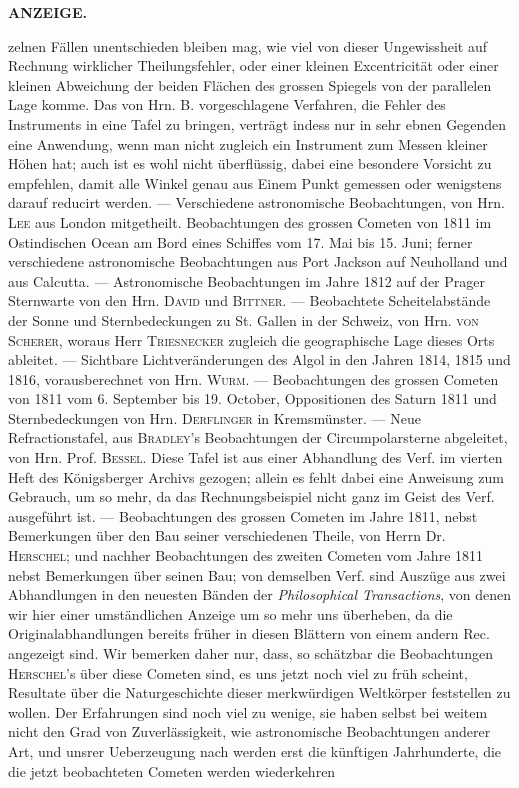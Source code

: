 \clearpage
\thispagestyle{empty}
\noindent{}%
%
\parbox[t]{\dimexpr\linewidth-24mm\relax}{\centering\footnotesize\bfseries ANZEIGE.\par}%
\makebox[12mm][r]{}\par\nobreak\medskip
\noindent zelnen Fällen unentschieden bleiben mag, wie viel von dieser Ungewissheit auf Rechnung wirklicher Theilungsfehler, oder einer kleinen Excentricität oder einer kleinen Abweichung der beiden Flächen des grossen Spiegels von der parallelen Lage komme. Das von Hrn. B. vorgeschlagene Verfahren, die Fehler des Instruments in eine Tafel zu bringen, verträgt indess nur in sehr ebnen Gegenden eine Anwendung, wenn man nicht zugleich ein Instrument zum Messen kleiner Höhen hat; auch ist es wohl nicht überflüssig, dabei eine besondere Vorsicht zu empfehlen, damit alle Winkel genau aus Einem Punkt gemessen oder wenigstens darauf reducirt werden. — Verschiedene astronomische Beobachtungen, von Hrn. \textsc{Lee} aus London mitgetheilt. Beobachtungen des grossen Cometen von 1811 im Ostindischen Ocean am Bord eines Schiffes vom 17. Mai bis 15. Juni; ferner verschiedene astronomische Beobachtungen aus Port Jackson auf Neuholland und aus Calcutta. — Astronomische Beobachtungen im Jahre 1812 auf der Prager Sternwarte von den Hrn. \textsc{David} und \textsc{Bittner}. — Beobachtete Scheitelabstände der Sonne und Sternbedeckungen zu St. Gallen in der Schweiz, von Hrn. \textsc{von Scherer}, woraus Herr \textsc{Triesnecker} zugleich die geographische Lage dieses Orts ableitet. — Sichtbare Lichtveränderungen des Algol in den Jahren 1814, 1815 und 1816, vorausberechnet von Hrn. \textsc{Wurm}. — Beobachtungen des grossen Cometen von 1811 vom 6. September bis 19. October, Oppositionen des Saturn 1811 und Sternbedeckungen von Hrn. \textsc{Derflinger} in Kremsmünster. — Neue Refractionstafel, aus \textsc{Bradley}'s Beobachtungen der Circumpolarsterne abgeleitet, von Hrn. Prof. \textsc{Bessel}. Diese Tafel ist aus einer Abhandlung des Verf. im vierten Heft des Königsberger Archivs gezogen; allein es fehlt dabei eine Anweisung zum Gebrauch, um so mehr, da das Rechnungsbeispiel nicht ganz im Geist des Verf. ausgeführt ist. — Beobachtungen des grossen Cometen im Jahre 1811, nebst Bemerkungen über den Bau seiner verschiedenen Theile, von Herrn Dr. \textsc{Herschel}; und nachher Beobachtungen des zweiten Cometen vom Jahre 1811 nebst Bemerkungen über seinen Bau; von demselben Verf. sind Auszüge aus zwei Abhandlungen in den neuesten Bänden der \emph{Philosophical Transactions}, von denen wir hier einer umständlichen Anzeige um so mehr uns überheben, da die Originalabhandlungen bereits früher in diesen Blättern von einem andern Rec. angezeigt sind. Wir bemerken daher nur, dass, so schätzbar die Beobachtungen \textsc{Herschel}'s über diese Cometen sind, es uns jetzt noch viel zu früh scheint, Resultate über die Naturgeschichte dieser merkwürdigen Weltkörper feststellen zu wollen. Der Erfahrungen sind noch viel zu wenige, sie haben selbst bei weitem nicht den Grad von Zuverlässigkeit, wie astronomische Beobachtungen anderer Art, und unsrer Ueberzeugung nach werden erst die künftigen Jahrhunderte, die die jetzt beobachteten Cometen werden wiederkehren 